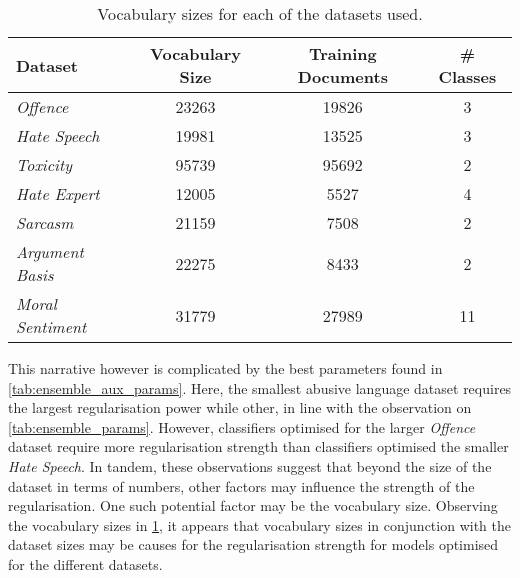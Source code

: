 \begin{table}[]
  \centering
  \begin{tabular}{l|ccc}
    Dataset                  & Vocabulary Size & Training Documents & \# Classes\\\hline
    \textit{Offence}         & 23263           & 19826              & 3\\
    \textit{Hate Speech}     & 19981           & 13525              & 3\\
    \textit{Toxicity}        & 95739           & 95692              & 2\\
    \textit{Hate Expert}     & 12005           & 5527               & 4\\
    \textit{Sarcasm}         & 21159           & 7508               & 2\\
    \textit{Argument Basis}  & 22275           & 8433               & 2\\
    \textit{Moral Sentiment} & 31779           & 27989              & 11
  \end{tabular}
  \caption{Vocabulary sizes for each of the datasets used.}
  \label{tab:aux_vocab_sizes}
\end{table}

This narrative however is complicated by the best parameters found in \cref{tab:ensemble_aux_params}.
Here, the smallest abusive language dataset requires the largest regularisation power while other, in line with the observation on \cref{tab:ensemble_params}.
However, classifiers optimised for the larger \textit{Offence} dataset require more regularisation strength than classifiers optimised the smaller \textit{Hate Speech}.
In tandem, these observations suggest that beyond the size of the dataset in terms of numbers, other factors may influence the strength of the regularisation.
One such potential factor may be the vocabulary size.
Observing the vocabulary sizes in \cref{tab:aux_vocab_sizes}, it appears that vocabulary sizes in conjunction with the dataset sizes may be causes for the regularisation strength for models optimised for the different datasets.

